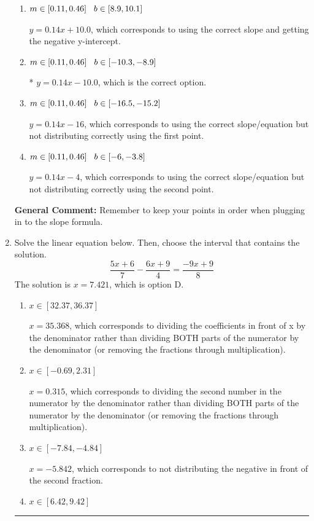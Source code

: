 \documentclass{extbook}[14pt]
\newcommand{\litem}[1]{\item #1

\rule{\textwidth}{0.4pt}}
\begin{document}
\begin{enumerate}
{\begin{enumerate}[label=\Alph*.]
 $y = -0.14x -12.0$, which corresponds to using the negative slope and the correct equation.
\item \( m \in [0.11, 0.46] \hspace*{3mm} b \in [8.9, 10.1] \)

 $y = 0.14x + 10.0$, which corresponds to using the correct slope and getting the negative y-intercept.
\item \( m \in [0.11, 0.46] \hspace*{3mm} b \in [-10.3, -8.9] \)

* $y = 0.14x -10.0$, which is the correct option.
\item \( m \in [0.11, 0.46] \hspace*{3mm} b \in [-16.5, -15.2] \)

 $y = 0.14x -16$, which corresponds to using the correct slope/equation but not distributing correctly using the first point.
\item \( m \in [0.11, 0.46] \hspace*{3mm} b \in [-6, -3.8] \)

 $y = 0.14x -4$, which corresponds to using the correct slope/equation but not distributing correctly using the second point.
\end{enumerate}

\textbf{General Comment:} Remember to keep your points in order when plugging in to the slope formula.
}
\litem{
Solve the linear equation below. Then, choose the interval that contains the solution.
\[ \frac{5x + 6}{7} - \frac{6x + 9}{4} = \frac{-9x + 9}{8} \]The solution is \( x = 7.421 \), which is option D.\begin{enumerate}[label=\Alph*.]
\item \( x \in [32.37, 36.37] \)

 $x = 35.368$, which corresponds to dividing the coefficients in front of x by the denominator rather than dividing BOTH parts of the numerator by the denominator (or removing the fractions through multiplication).
\item \( x \in [-0.69, 2.31] \)

 $x = 0.315$, which corresponds to dividing the second number in the numerator by the denominator rather than dividing BOTH parts of the numerator by the denominator (or removing the fractions through multiplication).
\item \( x \in [-7.84, -4.84] \)

 $x = -5.842$, which corresponds to not distributing the negative in front of the second fraction.
\item \( x \in [6.42, 9.42] \)


\end{enumerate}}
\end{enumerate}
\end{document}
